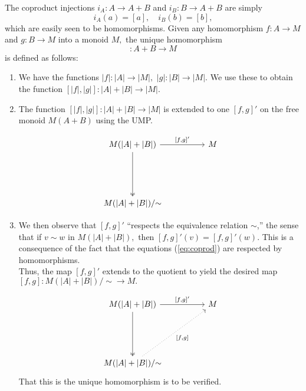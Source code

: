 \documentclass[11pt,leqno,landscape,semhelv]{seminar}
\theoremstyle{definition}
\numberwithin{joke}{section}
\numberwithin{thm}{section}
\numberwithin{equation}{section}
\begin{document}
The coproduct injections $i_A:A\to A+B$ and $i_B:B\to A+B$ are simply
\begin{equation*} 
  i_A(a) = [a], \quad i_B(b) = [b],
\end{equation*}
which are easily seen to be homomorphisms. Given any homomorphism $f:A\to M$ and $g:B\to M$ into a monoid $M,$ the unique homomorphism
\begin{equation*} 
  [f, g] : A + B \to M
\end{equation*}
is defined as follows:
\begin{enumerate}
  \item We have the functions $|f| : |A| \to |M|,$ $|g| : |B| \to |M|.$ We use these to obtain the function $[|f|, |g|] : |A| + |B| \to |M|.$
  \item The function $[|f|, |g|] : |A| + |B| \to |M|$ is extended to one $[f, g]'$ on the free monoid $M(A + B)$ using the UMP.
  
  \begin{equation*} 
    \begin{tikzcd}
     M({\vert}A{\vert} + {\vert}B{\vert}) \arrow[rr, "{[f, g]'}"] \arrow[ddd, two heads] &  & M \\
      &&\\&&\\
      M({\vert}A{\vert} + {\vert}B{\vert})/{\sim} &&
    \end{tikzcd}
  \end{equation*}
  \item We then observe that $[f, g]'$ ``respects the equivalence relation $\sim$,'' the sense that if $v \sim w$ in $M(|A| + |B|),$ then $[f, g]'(v) = [f, g]'(w).$ This is a consequence of the fact that the equations (\ref{eq:coprod}) are respected by homomorphisms.\\
  Thus, the map $[f, g]'$ extends to the quotient to yield the desired map $[f, g]:M(|A| + |B|)/\sim \to M.$

  \begin{equation*} 
    \begin{tikzcd}
     M({\vert}A{\vert} + {\vert}B{\vert}) \arrow[rr, "{[f, g]'}"] \arrow[ddd, two heads] &  & M \\
      &&\\&&\\
      M({\vert}A{\vert} + {\vert}B{\vert})/{\sim} \arrow[rruuu, "{[f, g]}"', dotted] &&
    \end{tikzcd}
  \end{equation*}
  That this is the unique homomorphism is to be verified.
\end{enumerate}
\end{document}
